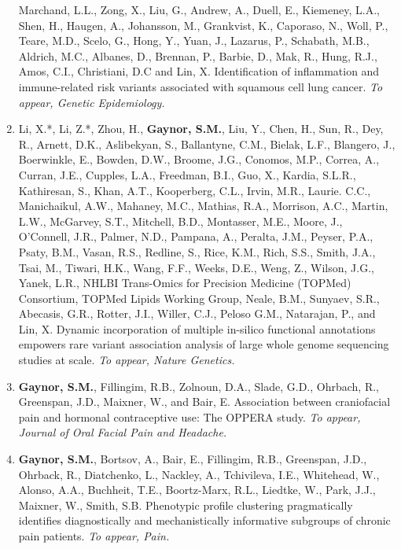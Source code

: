 \documentclass[10pt]{article}
\begin{document}
\begin{enumerate}
Marchand, L.L., Zong, X., Liu, G., Andrew, A., Duell, E., Kiemeney, L.A., Shen, H., Haugen, A.,
Johansson, M., Grankvist, K., Caporaso, N., Woll, P., Teare, M.D., Scelo, G., Hong, Y., Yuan, J.,
Lazarus, P., Schabath, M.B., Aldrich, M.C., Albanes, D., Brennan, P., Barbie, D., Mak, R., Hung,
R.J., Amos, C.I., Christiani, D.C and Lin, X. Identification of inflammation and immune-related risk variants associated with squamous cell lung cancer. \textit{To appear, Genetic Epidemiology.}
\item Li, X.*, Li, Z.*, Zhou, H., \textbf{Gaynor, S.M.}, Liu, Y., Chen, H., Sun, R., Dey, R., Arnett, D.K., Aslibekyan, S., Ballantyne, C.M., Bielak, L.F., Blangero, J., Boerwinkle, E., Bowden, D.W., Broome, J.G., Conomos, M.P., Correa, A., Curran, J.E., Cupples, L.A., Freedman, B.I.,  Guo, X., Kardia, S.L.R., Kathiresan, S., Khan, A.T.,  Kooperberg, C.L., Irvin, M.R., Laurie. C.C., Manichaikul, A.W., Mahaney, M.C., Mathias, R.A., Morrison, A.C., Martin, L.W., McGarvey, S.T., Mitchell, B.D., Montasser, M.E.,  Moore, J.,  O’Connell, J.R., Palmer, N.D., Pampana, A.,  Peralta, J.M.,  Peyser, P.A.,  Psaty, B.M., Vasan, R.S., Redline, S., Rice, K.M., Rich, S.S., Smith, J.A.,  Tsai, M., Tiwari, H.K., Wang, F.F., Weeks, D.E., Weng, Z., Wilson, J.G., Yanek, L.R., NHLBI Trans-Omics for Precision Medicine (TOPMed) Consortium, TOPMed Lipids Working Group, Neale, B.M., Sunyaev, S.R., Abecasis, G.R.,  Rotter, J.I.,  Willer, C.J., Peloso G.M., Natarajan, P., and Lin, X. Dynamic incorporation of multiple in-silico functional annotations empowers rare variant association analysis of large whole genome sequencing studies at scale. \textit{To appear, Nature Genetics.}
\item \textbf{Gaynor, S.M.}, Fillingim, R.B., Zolnoun, D.A., Slade, G.D., Ohrbach, R., Greenspan, J.D., Maixner, W.,  and Bair, E. Association between craniofacial pain and hormonal contraceptive use: The OPPERA study. \textit{To appear, Journal of Oral Facial Pain and Headache.}
\item \textbf{Gaynor, S.M.}, Bortsov, A., Bair, E., Fillingim, R.B., Greenspan, J.D., Ohrback, R., Diatchenko, L., Nackley, A., Tchivileva, I.E., Whitehead, W., Alonso, A.A., Buchheit, T.E., Boortz-Marx, R.L., Liedtke, W., Park, J.J., Maixner, W., Smith, S.B. Phenotypic profile clustering pragmatically identifies diagnostically and mechanistically informative subgroups of chronic pain patients.
\textit{To appear, Pain.}
\end{enumerate}

\vspace{0.2cm}
\end{document}
